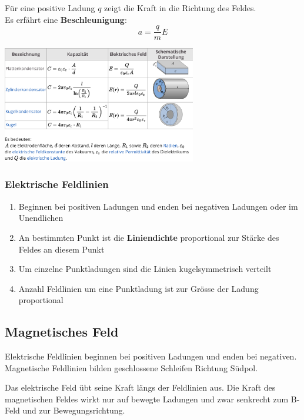 \documentclass[7pt]{article}
\begin{document}
\begin{multicols*}{3}
F{\"u}r eine positive Ladung $q$ zeigt die Kraft in die Richtung des Feldes. \\

Es erf{\"a}hrt eine \textbf{Beschleunigung}:
\begin{equation*}
	a = \frac{q}{m}E
\end{equation*}

\includegraphics[width=240pt]{images/mf/capacitor_formulas}

\subsubsection{Elektrische Feldlinien}

\begin{enumerate}[noitemsep]
	\item Beginnen bei positiven Ladungen und enden bei negativen Ladungen oder im Unendlichen
	\item An bestimmten Punkt ist die \textbf{Liniendichte} proportional zur St{\"a}rke des Feldes an diesem Punkt
	\item Um einzelne Punktladungen sind die Linien kugelsymmetrisch verteilt
	\item Anzahl Feldlinien um eine Punktladung ist zur Gr{\"o}sse der Ladung proportional
\end{enumerate}

\subsection{Magnetisches Feld}

\begin{description}[labelindent=16pt,style=multiline,leftmargin=2.5cm, noitemsep]
	\item[Richtung:] Elektrische Feldlinien beginnen bei positiven Ladungen und enden bei negativen.\newline
		Magnetische Feldlinien bilden geschlossene Schleifen Richtung S{\"u}dpol.
	\item[Kraft:] Das elektrische Feld {\"u}bt seine Kraft l{\"a}ngs der Feldlinien aus. \newline
				 Die Kraft des magnetischen Feldes wirkt nur auf bewegte Ladungen und zwar senkrecht zum B-Feld und zur Bewegungsrichtung.
\end{description}


\end{multicols*}
\end{document}
